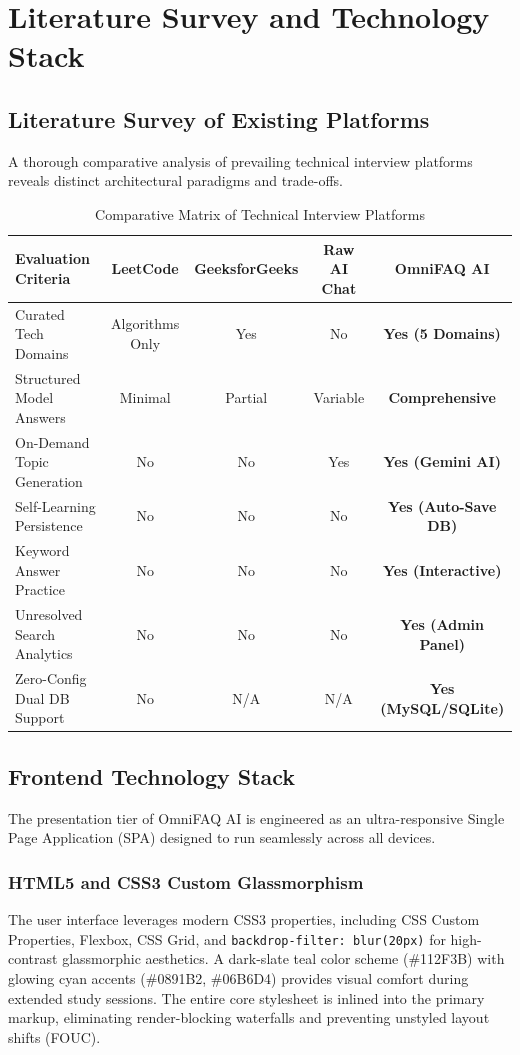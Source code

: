 \documentclass[12pt,a4paper]{report}
\begin{document}
\chapter{Literature Survey and Technology Stack}
\label{chap:lit_tech}

\section{Literature Survey of Existing Platforms}
A thorough comparative analysis of prevailing technical interview platforms reveals distinct architectural paradigms and trade-offs.

\begin{table}[h!]
\centering
\caption{Comparative Matrix of Technical Interview Platforms}
\label{tab:comparison}
\begin{tabularx}{\textwidth}{lcccc}
\toprule
\textbf{Evaluation Criteria} & \textbf{LeetCode} & \textbf{GeeksforGeeks} & \textbf{Raw AI Chat} & \textbf{OmniFAQ AI} \\
\midrule
Curated Tech Domains & Algorithms Only & Yes & No & \textbf{Yes (5 Domains)} \\
Structured Model Answers & Minimal & Partial & Variable & \textbf{Comprehensive} \\
On-Demand Topic Generation & No & No & Yes & \textbf{Yes (Gemini AI)} \\
Self-Learning Persistence & No & No & No & \textbf{Yes (Auto-Save DB)} \\
Keyword Answer Practice & No & No & No & \textbf{Yes (Interactive)} \\
Unresolved Search Analytics & No & No & No & \textbf{Yes (Admin Panel)} \\
Zero-Config Dual DB Support & No & N/A & N/A & \textbf{Yes (MySQL/SQLite)} \\
\bottomrule
\end{tabularx}
\end{table}

\section{Frontend Technology Stack}
The presentation tier of OmniFAQ AI is engineered as an ultra-responsive Single Page Application (SPA) designed to run seamlessly across all devices.

\subsection{HTML5 and CSS3 Custom Glassmorphism}
The user interface leverages modern CSS3 properties, including CSS Custom Properties, Flexbox, CSS Grid, and \texttt{backdrop-filter: blur(20px)} for high-contrast glassmorphic aesthetics. A dark-slate teal color scheme (\#112F3B) with glowing cyan accents (\#0891B2, \#06B6D4) provides visual comfort during extended study sessions. The entire core stylesheet is inlined into the primary markup, eliminating render-blocking waterfalls and preventing unstyled layout shifts (FOUC).
\end{document}
